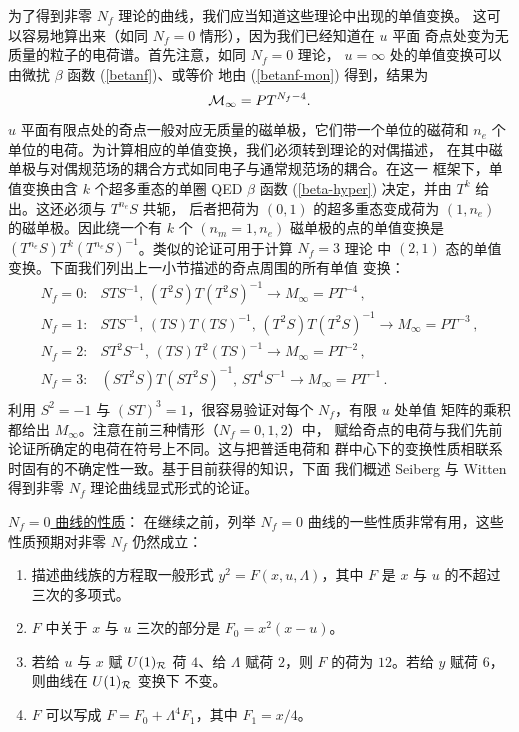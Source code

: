 为了得到非零 $N_f$ 理论的曲线，我们应当知道这些理论中出现的单值变换。
这可以容易地算出来（如同 $N_f=0$ 情形），因为我们已经知道在 $u$ 平面
奇点处变为无质量的粒子的电荷谱。首先注意，如同 $N_f=0$ 理论，
$u=\infty$ 处的单值变换可以由微扰 $\beta$ 函数 (\ref{betanf})、或等价
地由 (\ref{betanf-mon}) 得到，结果为
$$
{\cal M}_{\infty} = PT^{N_f -4}.
$$
$u$ 平面有限点处的奇点一般对应无质量的磁单极，它们带一个单位的磁荷和
$n_e$ 个单位的电荷。为计算相应的单值变换，我们必须转到理论的对偶描述，
在其中磁单极与对偶规范场的耦合方式如同电子与通常规范场的耦合。在这一
框架下，单值变换由含 $k$ 个超多重态的单圈 QED $\beta$ 函数
(\ref{beta-hyper}) 决定，并由 $T^k$ 给出。这还必须与 $T^{n_e}S$ 共轭，
后者把荷为 $(0,1)$ 的超多重态变成荷为 $(1,n_e)$ 的磁单极。因此绕一个有
$k$ 个 $(n_m = 1, n_e)$ 磁单极的点的单值变换是
$(T^{n_e}S) T^k (T^{n_e}S)^{-1}$。类似的论证可用于计算 $N_f = 3$ 理论
中 $(2,1)$ 态的单值变换。下面我们列出上一小节描述的奇点周围的所有单值
变换：
$$
\begin{array}{rl}
N_f=0:& STS^{-1},\,(T^2 S)T(T^2 S)^{-1}\rightarrow M_{\infty}=PT^{-4}\,,\\
N_f=1:& STS^{-1},\,(TS)T(TS)^{-1},\, (T^2S)T(T^2S)^{-1} \rightarrow
M_{\infty}=PT^{-3}\,, \\
N_f=2:& ST^2 S^{-1},\,(TS)T^2(TS)^{-1}\rightarrow M_{\infty}=PT^{-2}\,,\\
N_f=3:& (ST^2S)T(ST^2S)^{-1},\,ST^4 S^{-1}\rightarrow
M_{\infty}=PT^{-1}\,. \\
\end{array}
$$
利用 $S^2=-1$ 与 $(ST)^3=1$，很容易验证对每个 $N_f$，有限 $u$ 处单值
矩阵的乘积都给出 $M_{\infty}$。注意在前三种情形（$N_f = 0,1,2$）中，
赋给奇点的电荷与我们先前论证所确定的电荷在符号上不同。这与把普适电荷和
群中心下的变换性质相联系时固有的不确定性一致。基于目前获得的知识，下面
我们概述 Seiberg 与 Witten 得到非零 $N_f$ 理论曲线显式形式的论证。


\noindent\underline{$N_f =0$ 曲线的性质}：
在继续之前，列举 $N_f=0$ 曲线的一些性质非常有用，这些性质预期对非零
$N_f$ 仍然成立：
\begin{enumerate}
\item
描述曲线族的方程取一般形式 $y^2=F(x,u,\Lambda)$，其中 $F$ 是 $x$ 与 $u$
的不超过三次的多项式。
\item
$F$ 中关于 $x$ 与 $u$ 三次的部分是 $F_0 = x^2 (x-u)$。
\item
若给 $u$ 与 $x$ 赋 $U(1)_{\cal R}$ 荷 $4$、给 $\Lambda$ 赋荷 $2$，则
$F$ 的荷为 $12$。若给 $y$ 赋荷 $6$，则曲线在 $U(1)_{\cal R}$ 变换下
不变。
\item
$F$ 可以写成 $F = F_{0} + \Lambda^4 F_1$，其中 $F_1 = x/4$。
\end{enumerate}

